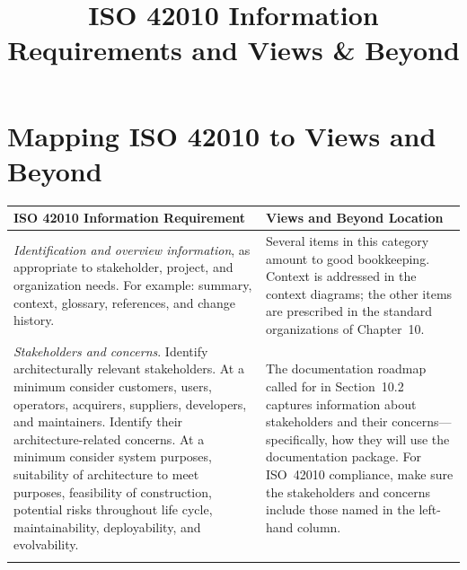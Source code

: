\documentclass[11pt]{article}
\begin{document}
\title{ISO 42010 Information Requirements and Views \& Beyond}
\author{}
\date{}
\maketitle

\section*{Mapping ISO 42010 to Views and Beyond}

\begin{longtable}{@{}%
  >{\raggedright\arraybackslash}p{}%
  >{\raggedright\arraybackslash}p{}@{}}
\toprule
\textbf{ISO 42010 Information Requirement} &
\textbf{Views and Beyond Location} \\
\midrule

\textit{Identification and overview information}, as appropriate to
stakeholder, project, and organization needs. For example: summary, context,
glossary, references, and change history. &
Several items in this category amount to good bookkeeping. Context is
addressed in the context diagrams; the other items are prescribed in the
standard organizations of Chapter~10. \\
\addlinespace[0.6em]

\textit{Stakeholders and concerns}. Identify architecturally relevant
stakeholders. At a minimum consider customers, users, operators, acquirers,
suppliers, developers, and maintainers. Identify their architecture-related
concerns. At a minimum consider system purposes, suitability of architecture to
meet purposes, feasibility of construction, potential risks throughout life
cycle, maintainability, deployability, and evolvability. &
The documentation roadmap called for in Section~10.2 captures information
about stakeholders and their concerns---specifically, how they will use the
documentation package. For ISO~42010 compliance, make sure the stakeholders
and concerns include those named in the left-hand column. \\
\addlinespace[0.6em]


\end{longtable}
\end{document}
